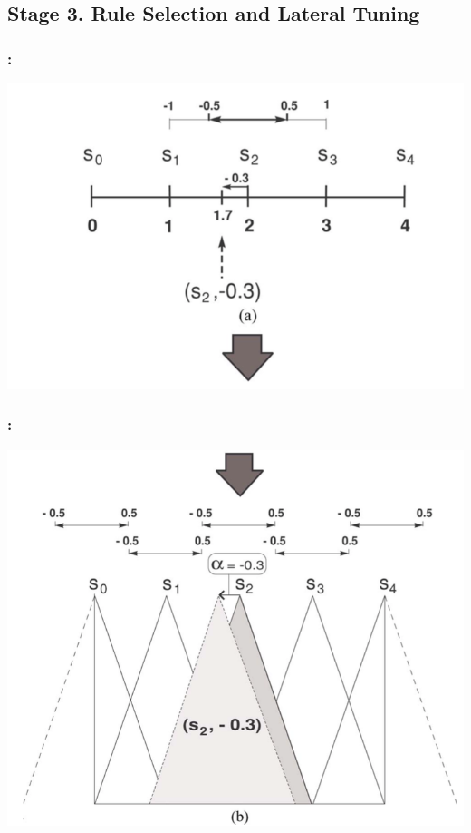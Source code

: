 \documentclass{beamer}
\begin{document}
\begin{CJK*}{UTF8}{bsmi}
\begin{frame}
\end{frame}


\subsection{Stage 3. Rule Selection and Lateral Tuning}

\begin{frame}
	\frametitle{\insertsection : \insertsubsection}

\begin{center}
\includegraphics[height=.6\linewidth]{./4.png}
\end{center}
\end{frame}

\begin{frame}
	\frametitle{\insertsection : \insertsubsection}
	
\begin{center}
\includegraphics[height=.65\textheight]{./5.png}
\end{center}
\end{frame}


\end{CJK*}
\end{document}

